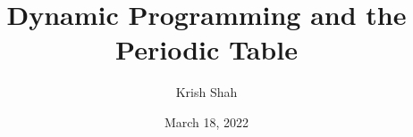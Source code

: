\documentclass[11pt]{scrartcl}
\title{Dynamic Programming and the Periodic Table}
\author{Krish Shah}
\date{March 18, 2022}
\begin{document}
\maketitle

\tableofcontents 



\raggedbottom




\end{document}
